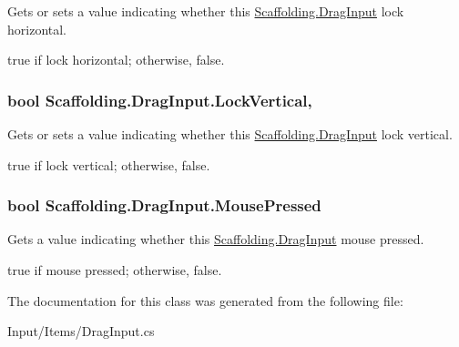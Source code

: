 Gets or sets a value indicating whether this \hyperlink{class_scaffolding_1_1_drag_input}{Scaffolding.\-Drag\-Input} lock horizontal. 

{\ttfamily true} if lock horizontal; otherwise, {\ttfamily false}.\hypertarget{class_scaffolding_1_1_drag_input_a5efcdda6db82447e4e61490c85977180}{
\subsubsection[{Lock\-Vertical}]{\setlength{\rightskip}{0pt plus 5cm}bool Scaffolding.\-Drag\-Input.\-Lock\-Vertical\hspace{0.3cm}{\ttfamily [get]}, {\ttfamily [set]}}}\label{class_scaffolding_1_1_drag_input_a5efcdda6db82447e4e61490c85977180}


Gets or sets a value indicating whether this \hyperlink{class_scaffolding_1_1_drag_input}{Scaffolding.\-Drag\-Input} lock vertical. 

{\ttfamily true} if lock vertical; otherwise, {\ttfamily false}.\hypertarget{class_scaffolding_1_1_drag_input_ab8e2d83d121fbd2b3ad60ef23fe5332f}{
\subsubsection[{Mouse\-Pressed}]{\setlength{\rightskip}{0pt plus 5cm}bool Scaffolding.\-Drag\-Input.\-Mouse\-Pressed\hspace{0.3cm}{\ttfamily [get]}}}\label{class_scaffolding_1_1_drag_input_ab8e2d83d121fbd2b3ad60ef23fe5332f}


Gets a value indicating whether this \hyperlink{class_scaffolding_1_1_drag_input}{Scaffolding.\-Drag\-Input} mouse pressed. 

{\ttfamily true} if mouse pressed; otherwise, {\ttfamily false}.

The documentation for this class was generated from the following file\-:\begin{DoxyCompactItemize}
\item 
Input/\-Items/Drag\-Input.\-cs\end{DoxyCompactItemize}
